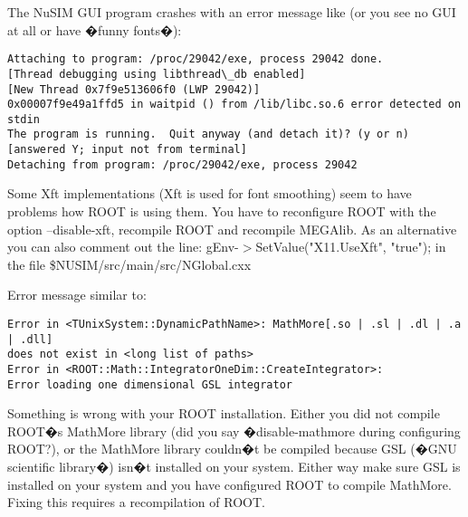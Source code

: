 The NuSIM GUI program crashes with an error message like (or you see no GUI at all or have �funny fonts�):
{\scriptsize \begin{verbatim}
Attaching to program: /proc/29042/exe, process 29042 done.
[Thread debugging using libthread\_db enabled]
[New Thread 0x7f9e513606f0 (LWP 29042)]
0x00007f9e49a1ffd5 in waitpid () from /lib/libc.so.6 error detected on stdin
The program is running.  Quit anyway (and detach it)? (y or n) [answered Y; input not from terminal]
Detaching from program: /proc/29042/exe, process 29042
\end{verbatim}}


Some Xft implementations (Xft is used for font smoothing) seem to have problems how ROOT is using them. You have to reconfigure ROOT with the option --disable-xft, recompile ROOT and recompile MEGAlib.
As an alternative you can also comment out the line:
gEnv-$>$SetValue("X11.UseXft", "true");
in the file \$NUSIM/src/main/src/NGlobal.cxx


Error message similar to:
{\scriptsize \begin{verbatim}
Error in <TUnixSystem::DynamicPathName>: MathMore[.so | .sl | .dl | .a | .dll] 
does not exist in <long list of paths>
Error in <ROOT::Math::IntegratorOneDim::CreateIntegrator>: 
Error loading one dimensional GSL integrator
\end{verbatim}
}

Something is wrong with your ROOT installation. Either you did not compile ROOT�s MathMore library (did you say �disable-mathmore during configuring ROOT?), or the MathMore library couldn�t be compiled because GSL (�GNU scientific library�) isn�t installed on your system. Either way make sure GSL is installed on your system and you have configured ROOT to compile MathMore. Fixing this requires a recompilation of ROOT.


